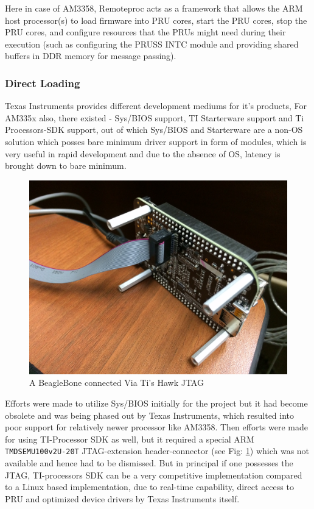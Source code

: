  Here in case of AM3358, Remoteproc acts as a framework that allows the ARM host processor(s) to load firmware into PRU cores, start the PRU cores, stop the PRU cores, and configure resources that the PRUs might need during their execution (such as configuring the PRUSS INTC module and providing shared buffers in DDR memory for message passing).

\subsubsection{Direct Loading}
Texas Instruments provides different development mediums for it's products, For  AM335x also, there existed - Sys/BIOS support, TI Starterware support and Ti Processors-SDK support, out of which Sys/BIOS and Starterware are a non-OS solution which posses bare minimum driver support in form of modules, which is very useful in rapid development and due to the absence of OS, latency is brought down to bare minimum.
\begin{figure}[h]
	\centering
	\includegraphics[width=\textwidth/2]{fig/bbb_jtag.jpg}
	\caption{A BeagleBone connected Via Ti's Hawk JTAG}
	\label{fig:BBB JTAG}
\end{figure}

Efforts were made to utilize Sys/BIOS initially for the project but it had become obsolete and was being phased out by Texas Instruments, which resulted into poor support for relatively newer processor like AM3358. Then efforts were made for using TI-Processor SDK as well, but it required a special ARM \texttt{TMDSEMU100v2U-20T} JTAG-extension header-connector (see Fig: \ref{fig:BBB JTAG}) which was not available and hence had to be dismissed. But in principal if one possesses the JTAG, TI-processors SDK can be a very competitive implementation compared to a Linux based implementation, due to real-time capability, direct access to PRU and optimized device drivers by Texas Instruments itself.


